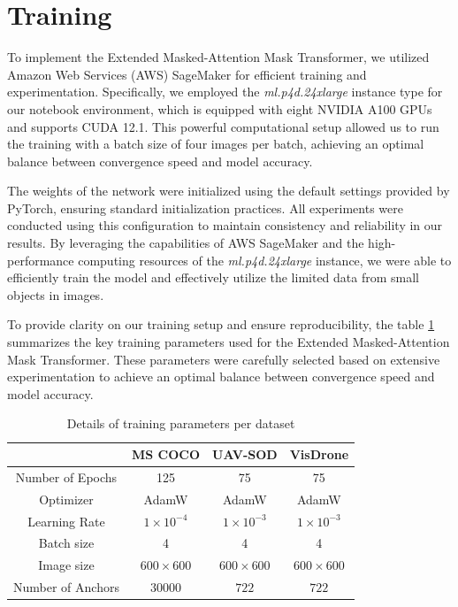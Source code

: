\newpage
\section{Training}

To implement the Extended Masked-Attention Mask Transformer, we utilized Amazon Web Services (AWS) SageMaker for efficient training and experimentation. 
Specifically, we employed the \textit{ml.p4d.24xlarge} instance type for our notebook environment, which is equipped with eight NVIDIA A100 GPUs and supports CUDA 12.1. 
This powerful computational setup allowed us to run the training with a batch size of four images per batch, achieving an optimal balance between convergence 
speed and model accuracy.

The weights of the network were initialized using the default settings provided by PyTorch, ensuring standard initialization practices. All experiments were 
conducted using this configuration to maintain consistency and reliability in our results. By leveraging the capabilities of AWS SageMaker and the high-performance 
computing resources of the \textit{ml.p4d.24xlarge} instance, we were able to efficiently train the model and effectively utilize the limited data from small objects in images.

To provide clarity on our training setup and ensure reproducibility, the table \ref{tab:training_parameters} summarizes the key training parameters used for the 
Extended Masked-Attention Mask Transformer. These parameters were carefully selected based on extensive experimentation to achieve an optimal balance between 
convergence speed and model accuracy. 
\begin{table}[h]
\centering
\begin{tabular}{|c|c|c|c|}
    \hline
    &                   \textbf{MS COCO}      & \textbf{UAV-SOD}     & \textbf{VisDrone}            \\ \hline
    Number of Epochs   & 125                  & 75                   & 75                           \\ \hline
    Optimizer          & AdamW                & AdamW                & AdamW                        \\ \hline
    Learning Rate      & $1 \times 10^{-4}$   & $1 \times 10^{-3}$   & $1 \times 10^{-3}$           \\ \hline
    Batch size         & 4                    &  4                   & 4                            \\ \hline
    Image size         & $600\times600$       &  $600\times600$      & $600\times600$               \\ \hline
    Number of Anchors  & $30000$              &  $722$               & $722$                        \\ \hline
\end{tabular}
\caption{Details of training parameters per dataset}
\label{tab:training_parameters}
\end{table}



